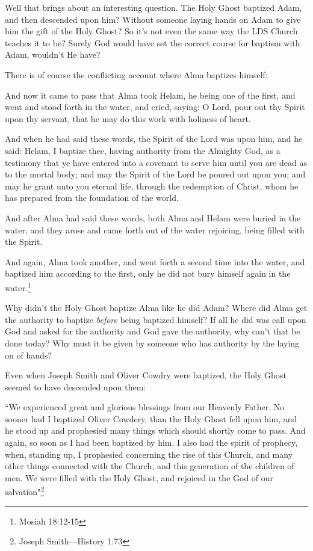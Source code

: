 Well that brings about an interesting question. The Holy Ghost baptized Adam, and
then descended upon him? Without someone laying hands on Adam to give him the gift of
the Holy Ghost? So it's not even the same way the LDS Church teaches it to be? Surely
God would have set the correct course for baptism with Adam, wouldn't He have?

There is of course the conflicting account where Alma baptizes himself:

\begin{displayquote}
And now it came to pass that Alma took Helam, he being one of the first, and went 
and stood forth in the water, and cried, saying: O Lord, pour out thy Spirit upon thy 
servant, that he may do this work with holiness of heart.

And when he had said these words, the Spirit of the Lord was upon him, and he 
said: Helam, I baptize thee, having authority from the Almighty God, as a testimony 
that ye have entered into a covenant to serve him until you are dead as to the mortal 
body; and may the Spirit of the Lord be poured out upon you; and may he grant unto 
you eternal life, through the redemption of Christ, whom he has prepared from the 
foundation of the world.

And after Alma had said these words, both Alma and Helam were buried in the 
water; and they arose and came forth out of the water rejoicing, being filled with 
the Spirit.

And again, Alma took another, and went forth a second time into the water, and 
baptized him according to the first, only he did not bury himself again in the 
water.\footnote{Mosiah 18:12-15}
\end{displayquote}

Why didn't the Holy Ghost baptize Alma like he did Adam? Where did Alma get the
authority to baptize \textit{before} being baptized himself? If all he did was call
upon God and asked for the authority and God gave the authority, why can't that be
done today? Why must it be given by someone who has authority by the laying on of
hands?

Even when Joseph Smith and Oliver Cowdry were baptized, the Holy Ghost seemed to have
descended upon them:

\begin{displayquote}
``We experienced great and glorious blessings from our Heavenly Father. No sooner had 
I baptized Oliver Cowdery, than the Holy Ghost fell upon him, and he stood up and 
prophesied many things which should shortly come to pass. And again, so soon as 
I had been baptized by him, I also had the spirit of prophecy, when, standing up, 
I prophesied concerning the rise of this Church, and many other things connected 
with the Church, and this generation of the children of men. We were filled with 
the Holy Ghost, and rejoiced in the God of our salvation"\footnote{
Joseph Smith—History 1:73}
\end{displayquote}


